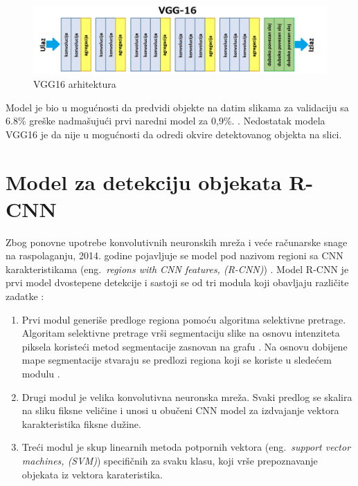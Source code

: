 \documentclass[12pt,oneside]{memoir}
\begin{document}
\begin{figure}[ht]
    \centering
    \includegraphics[width=1\textwidth]{matfmaster/glava2/vgg16_2.png}
    \caption{VGG16 arhitektura}
    \label{fig:section2_vgg16}
\end{figure}

Model je bio u mogućnosti da predvidi objekte na datim slikama za validaciju sa 6.8\% greške nadmašujući prvi naredni model za 0,9\%. \cite{simonyan2014very}. Nedostatak modela VGG16 je da nije u mogućnosti da odredi okvire detektovanog objekta na slici.



\section{Model za detekciju objekata R-CNN}
Zbog ponovne upotrebe konvolutivnih neuronskih mreža i veće računarske snage na raspolaganju, 2014. godine pojavljuje se model pod nazivom regioni sa CNN karakteristikama (eng.~\textit{regions with CNN features, (R-CNN)}) \cite{girshick2014rich}. 
Model R-CNN je prvi model dvostepene detekcije i sastoji se od tri modula koji obavljaju različite zadatke \cite{girshick2014rich}:
\begin{enumerate}
  \item Prvi modul generiše predloge regiona pomoću algoritma selektivne pretrage. Algoritam selektivne pretrage vrši segmentaciju slike na osnovu intenziteta piksela koristeći metod segmentacije zasnovan na grafu \cite{narayan2008image}. Na osnovu dobijene mape segmentacije stvaraju se predlozi regiona koji se koriste u sledećem modulu \cite{uijlings2013selective}.
  \item Drugi modul je velika konvolutivna neuronska mreža. Svaki predlog se skalira na sliku fiksne veličine i unosi u obučeni CNN model za izdvajanje vektora karakteristika fiksne dužine.
  \item Treći modul je skup linearnih metoda potpornih vektora (eng.~\textit{support vector machines, (SVM)}) specifičnih za svaku klasu, koji vrše prepoznavanje objekata iz vektora karateristika.
\end{enumerate}
\end{document}

